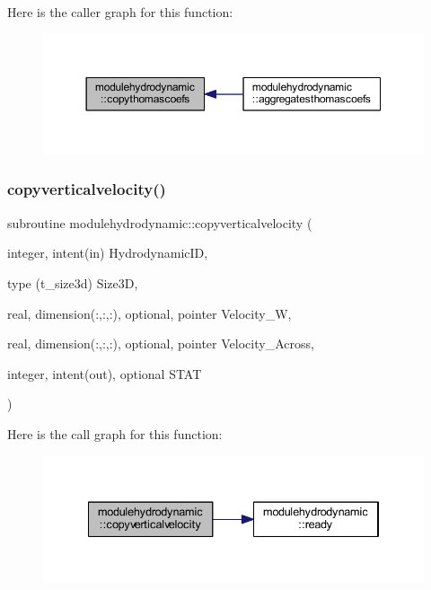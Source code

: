 Here is the caller graph for this function\+:\nopagebreak
\begin{figure}[H]
\begin{center}
\leavevmode
\includegraphics[width=350pt]{namespacemodulehydrodynamic_a080df16267de295975f460ddb4cba152_icgraph}
\end{center}
\end{figure}
\mbox{\label{namespacemodulehydrodynamic_a8d99754e0f222c6f691a79e16a3b85b5}} 
\subsubsection{\texorpdfstring{copyverticalvelocity()}{copyverticalvelocity()}}
{\footnotesize\ttfamily subroutine modulehydrodynamic\+::copyverticalvelocity (\begin{DoxyParamCaption}\item[{integer, intent(in)}]{Hydrodynamic\+ID,  }\item[{type (t\+\_\+size3d)}]{Size3D,  }\item[{real, dimension(\+:,\+:,\+:), optional, pointer}]{Velocity\+\_\+W,  }\item[{real, dimension(\+:,\+:,\+:), optional, pointer}]{Velocity\+\_\+\+Across,  }\item[{integer, intent(out), optional}]{S\+T\+AT }\end{DoxyParamCaption})\hspace{0.3cm}{\ttfamily [private]}}

Here is the call graph for this function\+:\nopagebreak
\begin{figure}[H]
\begin{center}
\leavevmode
\includegraphics[width=334pt]{namespacemodulehydrodynamic_a8d99754e0f222c6f691a79e16a3b85b5_cgraph}
\end{center}
\end{figure}
\mbox{\label{namespacemodulehydrodynamic_a389c77d3103d5944ec90680d613d2e56}} 
